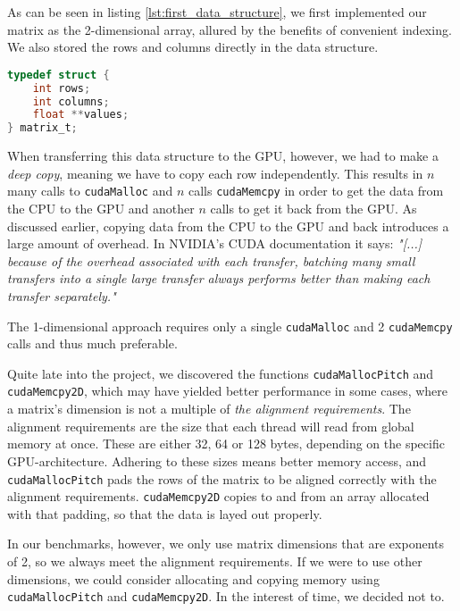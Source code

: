 \noindent As can be seen in listing \ref{lst:first_data_structure}, we first implemented our matrix as the 2-dimensional array, allured by the benefits of convenient indexing. We also stored the rows and columns directly in the data structure.

\begin{lstlisting}[language=C, caption={First implementation of the matrix data structure.}, label={lst:first_data_structure}]
typedef struct {
    int rows;
    int columns;
    float **values;
} matrix_t;
\end{lstlisting}

\noindent When transferring this data structure to the GPU, however, we had to make a \textit{deep copy}\cite{nvidia:deepcopy}, meaning we have to copy each row independently. This results in \(n\) many calls to \texttt{cudaMalloc} and \(n\) calls \texttt{cudaMemcpy} in order to get the data from the CPU to the GPU and another \(n\) calls to get it back from the GPU. As discussed earlier, copying data from the CPU to the GPU and back introduces a large amount of overhead. In NVIDIA's CUDA documentation it says: \textit{"[...] because of the overhead associated with each transfer, batching many small transfers into a single large transfer always performs better than making each transfer separately."}\cite[Sect. 5.3.1]{nvidia:cudadoc}

The 1-dimensional approach requires only a single \texttt{cudaMalloc} and 2 \texttt{cudaMemcpy} calls and thus much preferable.

Quite late into the project, we discovered the functions \texttt{cudaMallocPitch} and \texttt{cudaMemcpy2D}, which may have yielded better performance in some cases, where a matrix's dimension is not a multiple of \textit{the alignment requirements}. The alignment requirements are the size that each thread will read from global memory at once. These are either 32, 64 or 128 bytes, depending on the specific GPU-architecture.\cite[Sect. 5.3.2.]{nvidia:cudadoc} Adhering to these sizes means better memory access, and \texttt{cudaMallocPitch} pads the rows of the matrix to be aligned correctly with the alignment requirements. \texttt{cudaMemcpy2D} copies to and from an array allocated with that padding, so that the data is layed out properly.

In our benchmarks, however, we only use matrix dimensions that are exponents of 2, so we always meet the alignment requirements. If we were to use other dimensions, we could consider allocating and copying memory using \texttt{cudaMallocPitch} and \texttt{cudaMemcpy2D}. In the interest of time, we decided not to.\\

